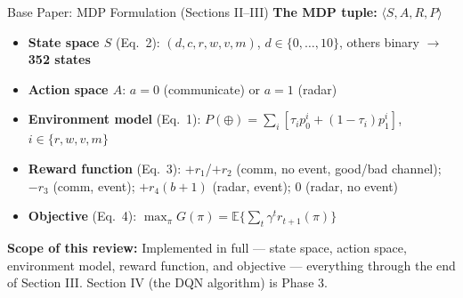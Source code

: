 \documentclass[aspectratio=169]{beamer}
\begin{document}
\begin{frame}{Base Paper: MDP Formulation (Sections II--III)}
  \footnotesize
  \textbf{The MDP tuple:} $\langle S, A, R, P \rangle$

  \begin{itemize}
    \setlength{\itemsep}{0.06cm}
    \item \textbf{State space $S$} (Eq.~2): $(d,c,r,w,v,m)$, $d\in\{0,\ldots,10\}$, others binary $\rightarrow$ \textbf{352 states}
    \item \textbf{Action space $A$}: $a=0$ (communicate) or $a=1$ (radar)
    \item \textbf{Environment model} (Eq.~1): $P(\oplus) = \sum_{i} \left[\tau_i p_0^i + (1-\tau_i)p_1^i\right]$, $i\in\{r,w,v,m\}$
    \item \textbf{Reward function} (Eq.~3): $+r_1$/$+r_2$ (comm, no event, good/bad channel); $-r_3$ (comm, event); $+r_4(b{+}1)$ (radar, event); $0$ (radar, no event)
    \item \textbf{Objective} (Eq.~4): $\displaystyle\max_\pi G(\pi) = \mathbb{E}\Big\{\sum_{t} \gamma^t r_{t+1}(\pi)\Big\}$
  \end{itemize}

  \vspace{0.25cm}
  \textbf{Scope of this review:} Implemented in full --- state space, action space, environment model, reward function, and objective --- everything through the end of Section III. Section IV (the DQN algorithm) is Phase 3.
\end{frame}
\end{document}
